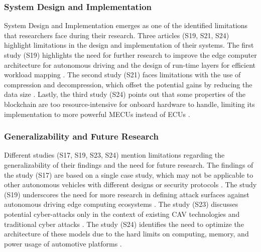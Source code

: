 \documentclass[a4paper,12pt]{article}
\begin{document}
\subsubsection{System Design and Implementation}
\hspace{5mm} System Design and Implementation emerges as one of the identified limitations that researchers face during their research. Three articles (S19, S21, S24) highlight limitations in the design and implementation of their systems. The first study (S19) highlights the need for further research to improve the edge computer architecture for autonomous driving and the design of run-time layers for efficient workload mapping \cite{s19}. The second study (S21) faces limitations with the use of compression and decompression, which offset the potential gains by reducing the data size \cite{s21}. Lastly, the third study (S24) points out that some properties of the blockchain are too resource-intensive for onboard hardware to handle, limiting its implementation to more powerful MECUs instead of ECUs \cite{s24}.

\subsubsection{Generalizability and Future Research}
\hspace{5mm} Different studies (S17, S19, S23, S24) mention limitations regarding the generalizability of their findings and the need for future research. The findings of the study (S17) are based on a single case study, which may not be applicable to other autonomous vehicles with different designs or security protocols \cite{s17}. The study (S19) underscores the need for more research in defining attack surfaces against autonomous driving edge computing ecosystems \cite{s19}. The study (S23) discusses potential cyber-attacks only in the context of existing CAV technologies and traditional cyber attacks \cite{s23}. The study (S24) identifies the need to optimize the architecture of these models due to the hard limits on computing, memory, and power usage of automotive platforms \cite{s24}.
\end{document}
